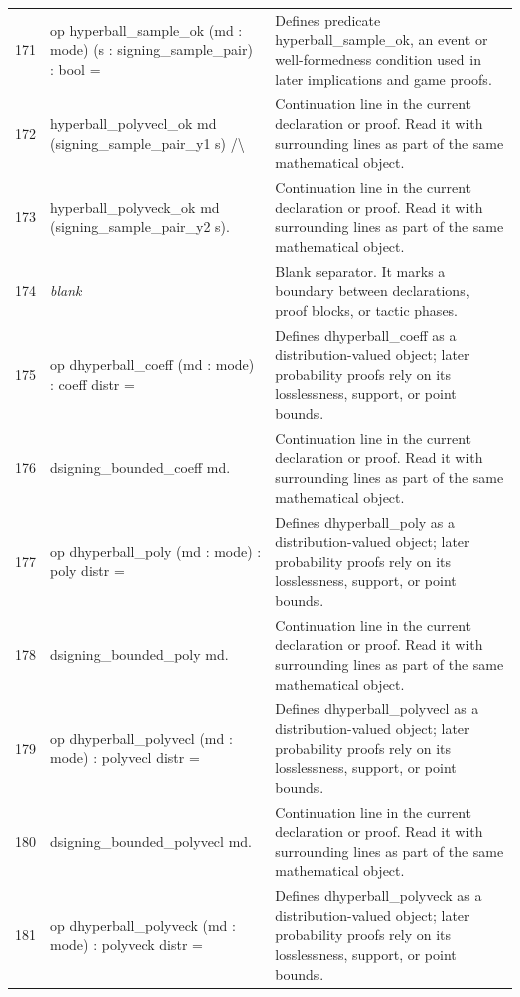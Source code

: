 \documentclass[10pt]{article}
\begin{document}
\begin{longtable}{r L{0.53\textwidth} L{0.37\textwidth}}
171 & {\ttfamily\scriptsize op hyperball\_sample\_ok (md : mode) (s : signing\_sample\_pair) : bool =} & Defines predicate hyperball\_sample\_ok, an event or well-formedness condition used in later implications and game proofs. \\
172 & {\ttfamily\scriptsize   hyperball\_polyvecl\_ok md (signing\_sample\_pair\_y1 s) /\textbackslash{}} & Continuation line in the current declaration or proof.  Read it with surrounding lines as part of the same mathematical object. \\
173 & {\ttfamily\scriptsize   hyperball\_polyveck\_ok md (signing\_sample\_pair\_y2 s).} & Continuation line in the current declaration or proof.  Read it with surrounding lines as part of the same mathematical object. \\
174 & {\ttfamily\scriptsize \emph{blank}} & Blank separator.  It marks a boundary between declarations, proof blocks, or tactic phases. \\
175 & {\ttfamily\scriptsize op dhyperball\_coeff (md : mode) : coeff distr =} & Defines dhyperball\_coeff as a distribution-valued object; later probability proofs rely on its losslessness, support, or point bounds. \\
176 & {\ttfamily\scriptsize   dsigning\_bounded\_coeff md.} & Continuation line in the current declaration or proof.  Read it with surrounding lines as part of the same mathematical object. \\
177 & {\ttfamily\scriptsize op dhyperball\_poly (md : mode) : poly distr =} & Defines dhyperball\_poly as a distribution-valued object; later probability proofs rely on its losslessness, support, or point bounds. \\
178 & {\ttfamily\scriptsize   dsigning\_bounded\_poly md.} & Continuation line in the current declaration or proof.  Read it with surrounding lines as part of the same mathematical object. \\
179 & {\ttfamily\scriptsize op dhyperball\_polyvecl (md : mode) : polyvecl distr =} & Defines dhyperball\_polyvecl as a distribution-valued object; later probability proofs rely on its losslessness, support, or point bounds. \\
180 & {\ttfamily\scriptsize   dsigning\_bounded\_polyvecl md.} & Continuation line in the current declaration or proof.  Read it with surrounding lines as part of the same mathematical object. \\
181 & {\ttfamily\scriptsize op dhyperball\_polyveck (md : mode) : polyveck distr =} & Defines dhyperball\_polyveck as a distribution-valued object; later probability proofs rely on its losslessness, support, or point bounds. \\

\end{longtable}
\end{document}
